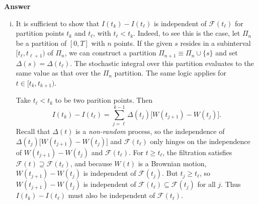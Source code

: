 \documentclass[11pt]{article}
\newcommand\cF{\mathcal{F}}
\newenvironment{hwanswer}
    {
        \vspace{2mm}
        {\bfseries Answer}
        \vspace{-\abovedisplayskip}
        \begin{center}
            \begin{tcolorbox}[
                width=0.95\textwidth,
                colback=white,
                colframe=white,
                opacityback=0,
                opacityframe=0,
                boxrule=0pt,
                frame hidden,
                breakable,
                before upper={\parindent15pt} %
            ]
            \lineskip=0pt %
    }
    {
        \end{tcolorbox}
        \end{center}
        \vspace{4mm}
    }
\begin{document}
    \begin{hwanswer}
        \begin{enumerate}[(i)]
            \item It is sufficient to show that $I(t_k) - I(t_{\ell})$ is independent of
            $\cF(t_{\ell})$ for partition points $t_{k}$ and $t_{\ell}$, with $t_{\ell}
            < t_{k}$. Indeed, to see this is the case, let $\Pi_{n}$ be a partition of $[0,
            T]$ with $n$ points. If the given $s$ resides in a subinterval $[t_{\ell},
            t_{\ell+1})$ of $\Pi_{n}$, we can construct a partition $\Pi_{n+1} \equiv \Pi_{n}
            \cup \{ s \}$ and set $\Delta(s) = \Delta(t_{\ell})$. The stochastic integral
            over this partition evaluates to the same value as that over the $\Pi_{n}$
            partition. The same logic applies for $t \in [t_{k}, t_{k+1})$.

            Take $t_{\ell} < t_{k}$ to be two parition points. Then
            \[
                I(t_{k}) - I(t_{\ell})
                =
                \sum_{j=\ell}^{k-1}
                \Delta(t_{j}) \big[ W(t_{j+1}) - W(t_{j}) \big].
            \]
            Recall that $\Delta(t)$ is a \emph{non-random} process, so the independence
            of $\Delta(t_{j}) \big[ W(t_{j+1}) - W(t_{j}) \big]$ and $\cF(t_{\ell})$ only
            hinges on the independence of $W(t_{j+1}) - W(t_{j})$ and $\cF(t_{\ell})$. For
            $t \geq t_{\ell}$, the filtration satisfies $\cF(t) \supseteq \cF(t_{\ell})$,
            and because $W(t)$ is a Brownian motion, $W(t_{j+1}) - W(t_{j})$ is independent
            of $\cF(t_{j})$. But $t_{j} \geq t_{\ell}$, so $W(t_{j+1}) - W(t_{j})$ is
            independent of $\cF(t_{\ell}) \subseteq \cF(t_{j})$ for all $j$. Thus $I(t_{k})
            - I(t_{\ell})$ must also be independent of $\cF(t_{\ell})$.


\end{enumerate}
\end{hwanswer}
\end{document}
